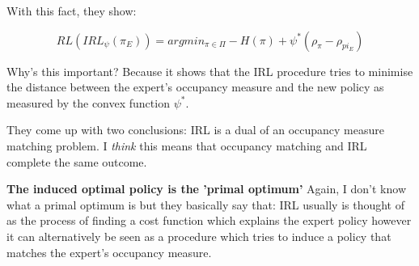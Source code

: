 \documentclass{article}
\begin{document}
With this fact, they show:

\[RL(IRL_{\psi}(\pi_{E})) = argmin_{\pi \in \Pi} -H(\pi) + \psi^{*}(\rho_{\pi} - \rho_{pi_{E}})\]

Why's this important? Because it shows that the IRL procedure tries to minimise the distance between the expert's occupancy measure and the new policy as measured by the convex function \(\psi^{*}\).

They come up with two conclusions:
IRL is a dual of an occupancy measure matching problem. I \emph{think} this means that occupancy matching and IRL complete the same outcome.

\textbf{The induced optimal policy is the 'primal optimum'} Again, I don't know what a primal optimum is but they basically say that: IRL usually is thought of as the process of finding a cost function which explains the expert policy however it can alternatively be seen as a procedure which tries to induce a policy that matches the expert's occupancy measure.
\end{document}
